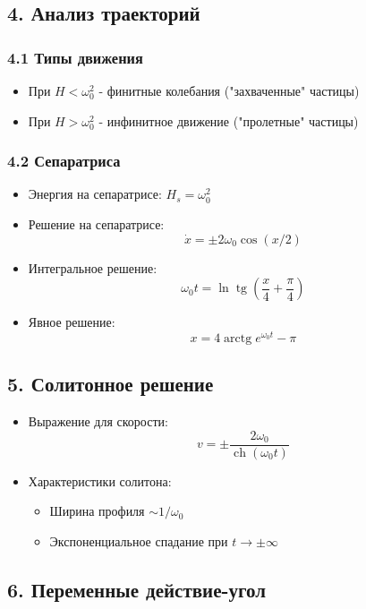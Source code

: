 \documentclass[10pt]{article}
\begin{document}
\subsection*{4. Анализ траекторий}
\subsubsection*{4.1 Типы движения}
\begin{itemize}
    \item При $H < \omega_{0}^{2}$ - финитные колебания ("захваченные" частицы)
    \item При $H > \omega_{0}^{2}$ - инфинитное движение ("пролетные" частицы)
\end{itemize}

\subsubsection*{4.2 Сепаратриса}
\begin{itemize}
    \item Энергия на сепаратрисе: $H_{s} = \omega_{0}^{2}$
    \item Решение на сепаратрисе:
    \[\dot{x} = \pm 2 \omega_{0} \cos (x / 2)\]
    \item Интегральное решение:
    \[\omega_{0} t = \ln \operatorname{tg}\left(\frac{x}{4} + \frac{\pi}{4}\right)\]
    \item Явное решение:
    \[x = 4 \operatorname{arctg} e^{\omega_{0} t} - \pi\]
\end{itemize}

\subsection*{5. Солитонное решение}
\begin{itemize}
    \item Выражение для скорости:
    \[v = \pm \frac{2 \omega_{0}}{\operatorname{ch}\left(\omega_{0} t\right)}\]
    \item Характеристики солитона:
        \begin{itemize}
            \item Ширина профиля $\sim 1 / \omega_{0}$
            \item Экспоненциальное спадание при $t \to \pm\infty$
        \end{itemize}
\end{itemize}

\subsection*{6. Переменные действие-угол}
\end{document}
